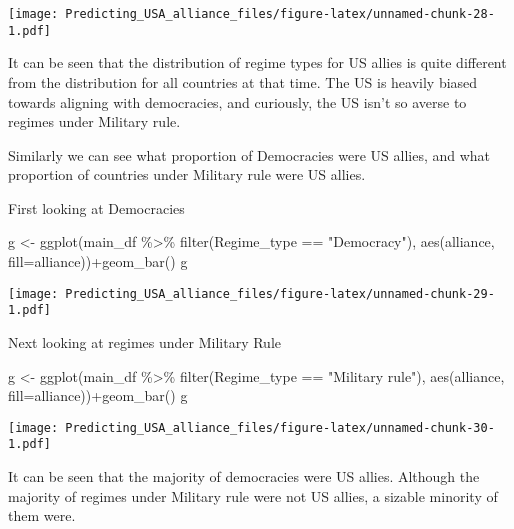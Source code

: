 \documentclass[
]{article}
\newenvironment{Shaded}{\begin{snugshade}}{\end{snugshade}}
\newcommand{\AttributeTok}[1]{\textcolor[rgb]{0.77,0.63,0.00}{#1}}
\newcommand{\FunctionTok}[1]{\textcolor[rgb]{0.00,0.00,0.00}{#1}}
\newcommand{\NormalTok}[1]{#1}
\newcommand{\OtherTok}[1]{\textcolor[rgb]{0.56,0.35,0.01}{#1}}
\newcommand{\SpecialCharTok}[1]{\textcolor[rgb]{0.00,0.00,0.00}{#1}}
\newcommand{\StringTok}[1]{\textcolor[rgb]{0.31,0.60,0.02}{#1}}
\begin{document}
\texttt{[image: Predicting\_USA\_alliance\_files/figure-latex/unnamed-chunk-28-1.pdf]}

It can be seen that the distribution of regime types for US allies is
quite different from the distribution for all countries at that time.
The US is heavily biased towards aligning with democracies, and
curiously, the US isn't so averse to regimes under Military rule.

Similarly we can see what proportion of Democracies were US allies, and
what proportion of countries under Military rule were US allies.

First looking at Democracies

\begin{Shaded}
\begin{Highlighting}[]
\NormalTok{g }\OtherTok{\textless{}{-}} \FunctionTok{ggplot}\NormalTok{(main\_df }\SpecialCharTok{\%\textgreater{}\%} \FunctionTok{filter}\NormalTok{(Regime\_type }\SpecialCharTok{==} \StringTok{"Democracy"}\NormalTok{), }\FunctionTok{aes}\NormalTok{(alliance, }\AttributeTok{fill=}\NormalTok{alliance))}\SpecialCharTok{+}\FunctionTok{geom\_bar}\NormalTok{() }
\NormalTok{g}
\end{Highlighting}
\end{Shaded}

\texttt{[image: Predicting\_USA\_alliance\_files/figure-latex/unnamed-chunk-29-1.pdf]}

Next looking at regimes under Military Rule

\begin{Shaded}
\begin{Highlighting}[]
\NormalTok{g }\OtherTok{\textless{}{-}} \FunctionTok{ggplot}\NormalTok{(main\_df }\SpecialCharTok{\%\textgreater{}\%} \FunctionTok{filter}\NormalTok{(Regime\_type }\SpecialCharTok{==} \StringTok{"Military rule"}\NormalTok{), }\FunctionTok{aes}\NormalTok{(alliance, }\AttributeTok{fill=}\NormalTok{alliance))}\SpecialCharTok{+}\FunctionTok{geom\_bar}\NormalTok{() }
\NormalTok{g}
\end{Highlighting}
\end{Shaded}

\texttt{[image: Predicting\_USA\_alliance\_files/figure-latex/unnamed-chunk-30-1.pdf]}

It can be seen that the majority of democracies were US allies. Although
the majority of regimes under Military rule were not US allies, a
sizable minority of them were.
\end{document}
